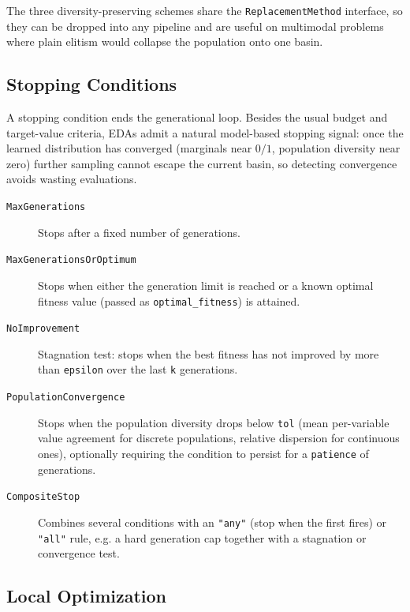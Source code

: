 \documentclass[a4paper,11pt]{article}
\begin{document}
The three diversity-preserving schemes share the \texttt{ReplacementMethod}
interface, so they can be dropped into any pipeline and are useful on multimodal
problems where plain elitism would collapse the population onto one basin.

\subsection{Stopping Conditions}

A stopping condition ends the generational loop. Besides the usual budget and
target-value criteria, EDAs admit a natural model-based stopping signal: once the
learned distribution has converged (marginals near $0/1$, population diversity
near zero) further sampling cannot escape the current basin, so detecting
convergence avoids wasting evaluations.

\begin{description}
  \item[\texttt{MaxGenerations}]
    Stops after a fixed number of generations.

  \item[\texttt{MaxGenerationsOrOptimum}]
    Stops when either the generation limit is reached or a known optimal fitness
    value (passed as \texttt{optimal\_fitness}) is attained.

  \item[\texttt{NoImprovement}]
    Stagnation test: stops when the best fitness has not improved by more than
    \texttt{epsilon} over the last \texttt{k} generations.

  \item[\texttt{PopulationConvergence}]
    Stops when the population diversity drops below \texttt{tol} (mean
    per-variable value agreement for discrete populations, relative dispersion
    for continuous ones), optionally requiring the condition to persist for a
    \texttt{patience} of generations.

  \item[\texttt{CompositeStop}]
    Combines several conditions with an \texttt{"any"} (stop when the first
    fires) or \texttt{"all"} rule, e.g. a hard generation cap together with a
    stagnation or convergence test.
\end{description}

\subsection{Local Optimization}
\end{document}
